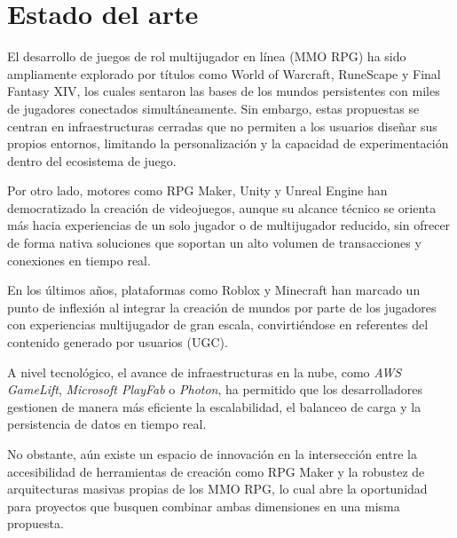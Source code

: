 \section{Estado del arte}

El desarrollo de juegos de rol multijugador en línea (MMO RPG) ha sido ampliamente explorado por títulos como World of Warcraft,
RuneScape y Final Fantasy XIV, los cuales sentaron las bases de los mundos persistentes con miles de jugadores conectados simultáneamente.
Sin embargo, estas propuestas se centran en infraestructuras cerradas que no permiten a los usuarios diseñar sus propios entornos,
limitando la personalización y la capacidad de experimentación dentro del ecosistema de juego. 
\vspace{0.25cm}

Por otro lado, motores como RPG Maker, Unity y Unreal Engine han democratizado la creación de videojuegos,
aunque su alcance técnico se orienta más hacia experiencias de un solo jugador o de multijugador reducido,
sin ofrecer de forma nativa soluciones que soportan un alto volumen de transacciones y conexiones en tiempo real.
\vspace{0.25cm}

En los últimos años, plataformas como Roblox y Minecraft han marcado un punto de inflexión al integrar la creación de mundos por parte de los jugadores
con experiencias multijugador de gran escala, convirtiéndose en referentes del contenido generado por usuarios (UGC). 
\vspace{0.25cm}

A nivel tecnológico, el avance de infraestructuras en la nube, como \textit{AWS GameLift}, \textit{Microsoft PlayFab} o \textit{Photon}, ha permitido que los desarrolladores 
gestionen de manera más eficiente la escalabilidad, el balanceo de carga y la persistencia de datos en tiempo real.
\vspace{0.25cm}

No obstante, aún existe un espacio de innovación en la intersección entre la accesibilidad de herramientas de creación como RPG Maker 
y la robustez de arquitecturas masivas propias de los MMO RPG, lo cual abre la oportunidad para proyectos que busquen combinar ambas dimensiones en una misma propuesta.
